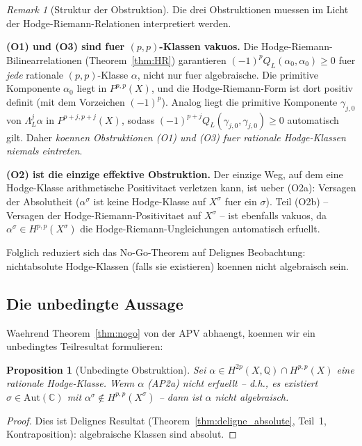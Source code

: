 \documentclass[aps,prd,twocolumn,superscriptaddress,nofootinbib]{revtex4-2}
\newtheorem{proposition}[theorem]{Proposition}
\theoremstyle{definition}
\theoremstyle{remark}
\newtheorem{remark}[theorem]{Remark}
\begin{document}
\begin{remark}[Struktur der Obstruktion]
\label{rem:obstruction_structure}
Die drei Obstruktionen muessen im Licht der Hodge-Riemann-Relationen interpretiert werden.

\textbf{(O1) und (O3) sind fuer $(p,p)$-Klassen vakuos.} Die Hodge-Riemann-Bilinearrelationen (Theorem~\ref{thm:HR}) garantieren $(-1)^p Q_L(\alpha_0, \alpha_0) \geq 0$ fuer \textit{jede} rationale $(p,p)$-Klasse $\alpha$, nicht nur fuer algebraische. Die primitive Komponente $\alpha_0$ liegt in $P^{p,p}(X)$, und die Hodge-Riemann-Form ist dort positiv definit (mit dem Vorzeichen $(-1)^p$). Analog liegt die primitive Komponente $\gamma_{j,0}$ von $\Lambda_L^j \alpha$ in $P^{p+j,p+j}(X)$, sodass $(-1)^{p+j} Q_L(\gamma_{j,0}, \gamma_{j,0}) \geq 0$ automatisch gilt. Daher \textit{koennen Obstruktionen (O1) und (O3) fuer rationale Hodge-Klassen niemals eintreten}.

\textbf{(O2) ist die einzige effektive Obstruktion.} Der einzige Weg, auf dem eine Hodge-Klasse arithmetische Positivitaet verletzen kann, ist ueber (O2a): Versagen der Absolutheit ($\alpha^\sigma$ ist keine Hodge-Klasse auf $X^\sigma$ fuer ein $\sigma$). Teil (O2b) -- Versagen der Hodge-Riemann-Positivitaet auf $X^\sigma$ -- ist ebenfalls vakuos, da $\alpha^\sigma \in H^{p,p}(X^\sigma)$ die Hodge-Riemann-Ungleichungen automatisch erfuellt.

Folglich reduziert sich das No-Go-Theorem auf Delignes Beobachtung: nichtabsolute Hodge-Klassen (falls sie existieren) koennen nicht algebraisch sein.
\end{remark}

\subsection{Die unbedingte Aussage}

Waehrend Theorem~\ref{thm:nogo} von der APV abhaengt, koennen wir ein unbedingtes Teilresultat formulieren:

\begin{proposition}[Unbedingte Obstruktion]
\label{prop:unconditional}
Sei $\alpha \in H^{2p}(X, \mathbb{Q}) \cap H^{p,p}(X)$ eine rationale Hodge-Klasse. Wenn $\alpha$ (AP2a) nicht erfuellt -- d.h., es existiert $\sigma \in \mathrm{Aut}(\mathbb{C})$ mit $\alpha^\sigma \notin H^{p,p}(X^\sigma)$ -- dann ist $\alpha$ nicht algebraisch.
\end{proposition}

\begin{proof}
Dies ist Delignes Resultat (Theorem~\ref{thm:deligne_absolute}, Teil~1, Kontraposition): algebraische Klassen sind absolut.
\end{proof}
\end{document}
